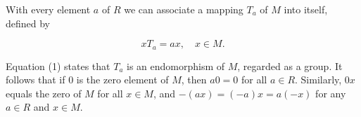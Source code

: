 With every element $a$ of $R$ we can associate a mapping $T_a$ of $M$ into itself, defined by

$$xT_a = ax, \quad x \in M.$$

Equation (1) states that $T_a$ is an endomorphism of $M$, regarded as a group. It follows that if $0$ is the zero element of $M$, then $a0 = 0$ for all $a \in R$. Similarly, $0x$ equals the zero of $M$ for all $x \in M$, and $-(ax) = (-a)x = a(-x)$ for any $a \in R$ and $x \in M$.
